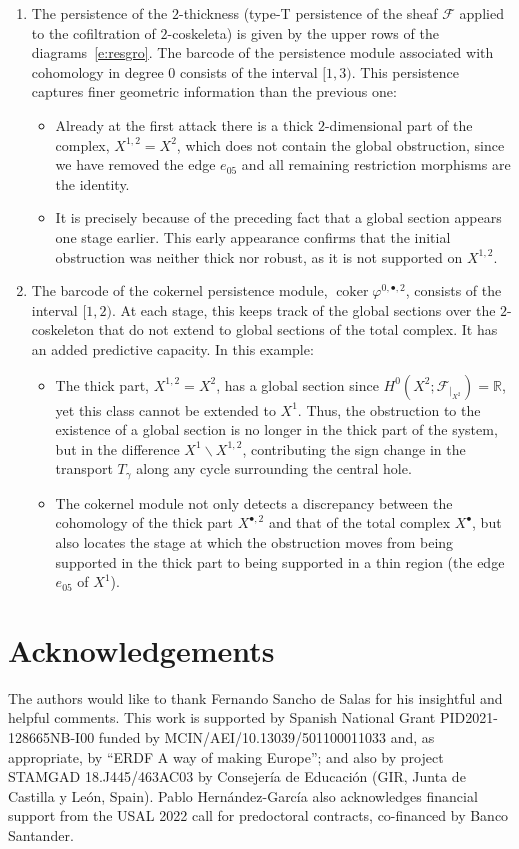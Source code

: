 \documentclass[reqno,12pt]{amsart}
\DeclareMathOperator{\coker}{coker}
\newcommand{\0}{\mathbf 0}
\theoremstyle{definition}
\begin{document}
\begin{enumerate}
\item The persistence of the \(2\)-thickness (type-T persistence of the sheaf $\mathcal F$ applied to the cofiltration of $2$-coskeleta) is given by the upper rows of the diagrams~\eqref{e:resgro}. The barcode of the persistence module associated with cohomology in degree $0$ consists of the interval $[1,3)$. This persistence captures finer geometric information than the previous one:
\begin{itemize}
\item Already at the first attack there is a thick \(2\)-dimensional part of the complex, $X^{1,2}=X^{2}$, which does not contain the global obstruction, since we have removed the edge $e_{05}$ and all remaining restriction morphisms are the identity.
\item It is precisely because of the preceding fact that a global section appears one stage earlier. This early appearance confirms that the initial obstruction was neither thick nor robust, as it is not supported on $X^{1,2}$.
\end{itemize}
\item The barcode of the cokernel persistence module, $\coker \varphi^{0,\bullet,2}$, consists of the interval $[1,2)$. At each stage, this keeps track of the global sections over the $2$-coskeleton that do not extend to global sections of the total complex. It has an added predictive capacity. In this example:
\begin{itemize}
    \item The thick part, \(X^{1,2}=X^2\), has a global section since \(H^0(X^{2};\mathcal F_{|_{X^2}})=\mathbb R\), yet this class cannot be extended to $X^1$. Thus, the obstruction to the existence of a global section is no longer in the thick part of the system, but in the difference $X^1\smallsetminus X^{1,2}$, contributing the sign change in the transport $T_{\gamma}$ along any cycle surrounding the central hole.
    \item The cokernel module not only detects a discrepancy between the cohomology of the thick part $X^{\bullet,2}$ and that of the total complex $X^\bullet$, but also locates the stage at which the obstruction moves from being supported in the thick part to being supported in a thin region (the edge $e_{05}$ of $X^1$).
\end{itemize}
\end{enumerate}




\section*{Acknowledgements} 
The authors would like to thank Fernando Sancho de Salas for his insightful and helpful comments. This work is supported by Spanish National Grant PID2021-128665NB-I00 funded by MCIN/AEI/10.13039/501100011033 and, as appropriate, by ``ERDF A way of making Europe''; and also by project STAMGAD 18.J445/463AC03 by Consejer\'ia de Educaci\'on (GIR, Junta de Castilla y Le\'on, Spain).  Pablo Hern\'andez-Garc\'ia also acknowledges financial support from the USAL 2022 call for predoctoral contracts, co-financed by Banco Santander.
    




\end{document}
